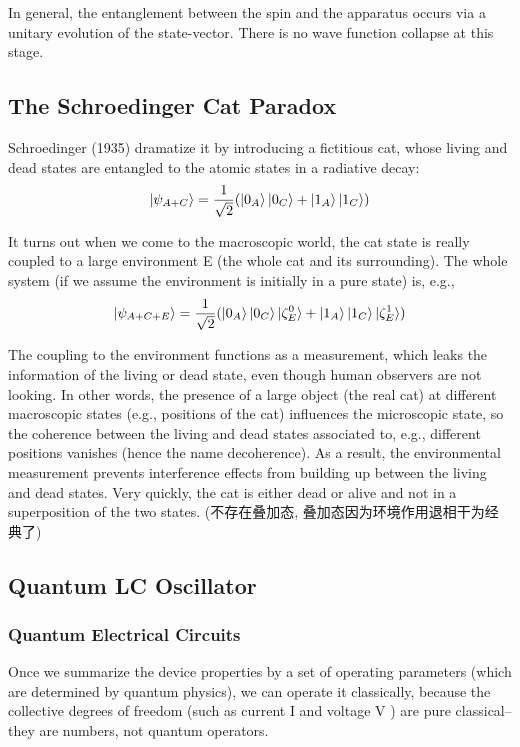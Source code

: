 In general, the entanglement between the spin and the apparatus occurs via a unitary evolution of the state-vector. There is no wave function collapse at this stage. 

\subsection{The Schroedinger Cat Paradox}
Schroedinger (1935) dramatize it by introducing a fictitious cat, whose living and dead states are entangled to the atomic states in a radiative decay:
\begin{align*}
    \ket{\psi_{A+C}}=\frac{1}{\sqrt{2}}(\ket{0_A}\ket{0_C}+\ket{1_A}\ket{1_C})
\end{align*}

It turns out when we come to the macroscopic world, the cat state is really coupled to a large environment E (the whole cat and its surrounding). The whole system (if we assume the environment is initially in a pure state) is, e.g.,
\begin{align*}
    \ket{\psi_{A+C+E}}=\frac{1}{\sqrt{2}}(\ket{0_A}\ket{0_C}\ket{\zeta_E^0}+\ket{1_A}\ket{1_C}\ket{\zeta_E^1}) 
\end{align*}

The coupling to the environment functions as a measurement, which leaks the information of the living or dead state, even though human observers are not looking. In other words, the presence of a large object (the real cat) at different macroscopic states (e.g., positions of the cat) influences the microscopic state, so the coherence between the living and dead states associated to, e.g., different positions vanishes (hence the name decoherence). As a result, the environmental measurement prevents interference effects from building up between the living and dead states. Very quickly, the cat is either dead or alive and not in a superposition of the two states. (不存在叠加态, 叠加态因为环境作用退相干为经典了)


\subsection{Quantum LC Oscillator}
\subsubsection{Quantum Electrical Circuits}
Once we summarize the device properties by a set of operating parameters (which are determined by quantum physics), we can operate it classically, because the collective degrees of freedom (such as current I and voltage V ) are pure classical–they are numbers, not quantum operators.

